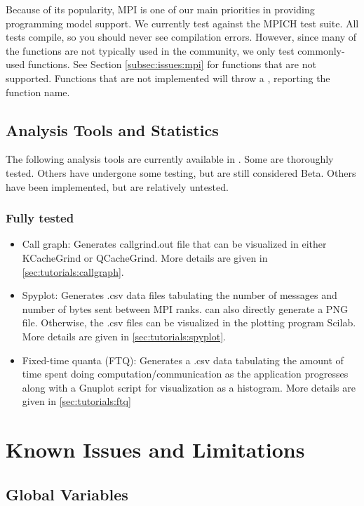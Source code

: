 Because of its popularity, MPI is one of our main priorities in providing programming model support.  
We currently test against the MPICH test suite. All tests compile, so you should never see compilation errors.  
However, since many of the functions are not typically used in the community, we only test commonly-used functions.   
See Section \ref{subsec:issues:mpi} for functions that are not supported.  
Functions that are not implemented will throw a , reporting the function name. 

\subsection{Analysis Tools and Statistics}
\label{subsec:intro:toolsandstats}
The following analysis tools are currently available in \sstmacro.
Some are thoroughly tested. Others have undergone some testing, but are still considered Beta.  Others have been implemented, but are relatively untested.

\subsubsection{Fully tested}
\label{subsubsec:intro:fulltestedtools}
\begin{itemize}
\item Call graph: Generates callgrind.out file that can be visualized in either KCacheGrind or QCacheGrind. More details are given in \ref{sec:tutorials:callgraph}.
\item Spyplot: Generates .csv data files tabulating the number of messages and number of bytes sent between MPI ranks. \sstmacro can also directly generate a PNG file. Otherwise, the .csv files can be visualized in the plotting program Scilab. More details are given in \ref{sec:tutorials:spyplot}.
\item Fixed-time quanta (FTQ): Generates a .csv data tabulating the amount of time spent doing computation/communication as the application progresses along with a Gnuplot script for visualization as a histogram. More details are given in \ref{sec:tutorials:ftq}
\end{itemize}

\section{Known Issues and Limitations}
\label{sec:intro:issues}

\subsection{Global Variables}
\label{subsec:issues:globals}

